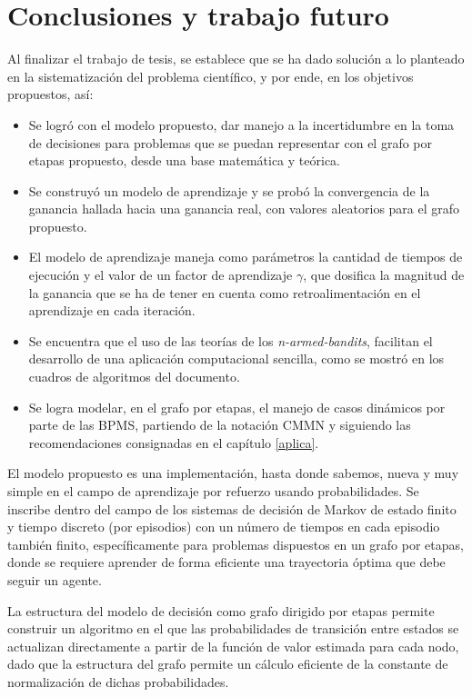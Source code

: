 \chapter{Conclusiones y trabajo futuro}

Al finalizar el trabajo de tesis, se establece que se ha dado solución a lo planteado en la sistematización del problema científico, y por ende, en los objetivos propuestos, así:

\begin{itemize}
    \item Se logró con el modelo propuesto, dar manejo a la incertidumbre en la toma de decisiones para problemas que se puedan representar con el grafo por etapas propuesto, desde una base matemática y teórica.    
    \item Se construyó un modelo de aprendizaje y se probó la convergencia de la ganancia hallada hacia una ganancia real, con valores aleatorios para el grafo propuesto.   
    \item El modelo de aprendizaje maneja como parámetros la cantidad de tiempos de ejecución y el valor de un factor de aprendizaje $\gamma$, que dosifica la magnitud de la ganancia que se ha de tener en cuenta como retroalimentación en el aprendizaje en cada iteración.
    \item Se encuentra que el uso de las teorías de los \textit{n-armed-bandits}, facilitan el desarrollo de una aplicación computacional sencilla, como se mostró en los cuadros de algoritmos del documento.   
    \item Se logra modelar, en el grafo por etapas, el manejo de casos dinámicos por parte de las BPMS, partiendo de la notación CMMN y siguiendo las recomendaciones consignadas en el capítulo \ref{aplica}.   
\end{itemize} 

El modelo propuesto es una implementación, hasta donde sabemos, nueva y muy simple en el campo de aprendizaje por refuerzo usando probabilidades. Se inscribe dentro del campo de los sistemas de decisión de Markov de estado finito y tiempo discreto (por episodios) con un número de tiempos en cada episodio también finito, específicamente para problemas dispuestos en un grafo por etapas, donde se requiere aprender de forma eficiente una trayectoria óptima que debe seguir un agente.

La estructura del modelo de decisión como grafo dirigido por etapas permite construir un algoritmo en el que las probabilidades de transición entre estados se actualizan directamente a partir de la función de valor estimada para cada nodo, dado que la estructura del grafo permite un cálculo eficiente de la constante de normalización de dichas probabilidades.

